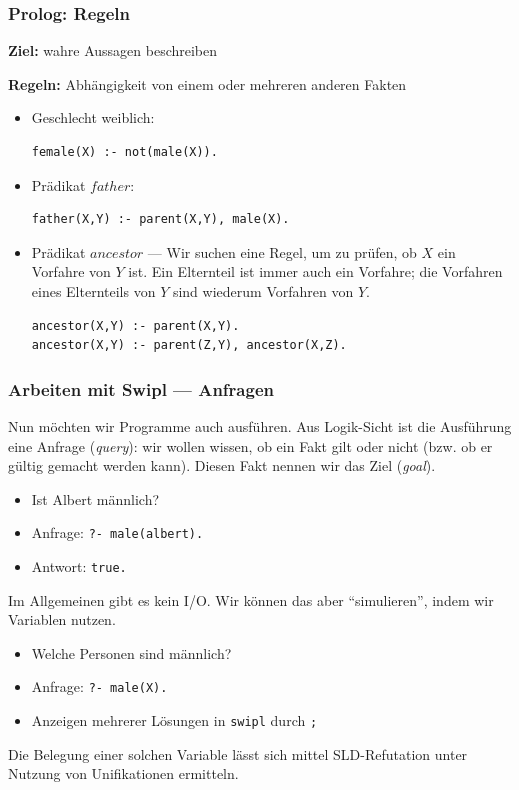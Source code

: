\documentclass{beamer}
\begin{document}
\begin{frame}[fragile] \frametitle{Prolog: Regeln}
	\footnotesize
	
	\textbf{Ziel:} wahre Aussagen beschreiben
	
	\textbf{Regeln:} Abhängigkeit von einem oder mehreren anderen Fakten
		
	\begin{itemize}
		\item Geschlecht weiblich: \pause
		\begin{lstlisting}[frame=l, basicstyle=\ttfamily\scriptsize,firstnumber=23]
female(X) :- not(male(X)).
		\end{lstlisting} \pause
		\item Prädikat $father$: \pause
		\begin{lstlisting}[frame=l, basicstyle=\ttfamily\scriptsize,firstnumber=25]
father(X,Y) :- parent(X,Y), male(X).
		\end{lstlisting} \pause
		\item Prädikat $ancestor$ --- Wir suchen eine Regel, um zu prüfen, ob $X$ ein Vorfahre von $Y$ ist.
		\pause
		Ein Elternteil ist immer auch ein Vorfahre; die Vorfahren eines Elternteils von $Y$ sind wiederum Vorfahren von $Y$.
		\pause
		\begin{lstlisting}[frame=l, basicstyle=\ttfamily\scriptsize,firstnumber=27]
ancestor(X,Y) :- parent(X,Y).
ancestor(X,Y) :- parent(Z,Y), ancestor(X,Z).
		\end{lstlisting}
	\end{itemize}
\end{frame}

\begin{frame} \frametitle{Arbeiten mit Swipl --- Anfragen}
	\footnotesize
	Nun möchten wir Programme auch ausführen. Aus Logik-Sicht ist die Ausführung eine Anfrage (\textit{query}): wir wollen wissen, ob ein Fakt gilt oder nicht (bzw. ob er gültig gemacht werden kann). Diesen Fakt nennen wir das Ziel (\textit{goal}).
	\begin{itemize}
		\item Ist Albert männlich?
		\item Anfrage: \texttt{?- male(albert).}
		\item Antwort: \texttt{true.}
	\end{itemize}

	\pause
	
	Im Allgemeinen gibt es kein I/O. Wir können das aber \enquote{simulieren}, indem wir Variablen nutzen. 
	\begin{itemize}
		\item Welche Personen sind männlich?
		\item Anfrage: \texttt{?- male(X).}
		\item Anzeigen mehrerer Lösungen in \texttt{swipl} durch \texttt{;}
	\end{itemize}

	Die Belegung einer solchen Variable lässt sich mittel SLD-Refutation unter Nutzung von Unifikationen ermitteln.
\end{frame}
\end{document}

